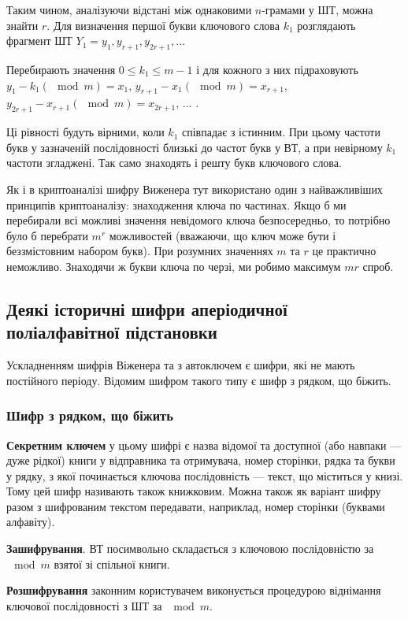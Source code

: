 Таким чином, аналізуючи відстані між однаковими $n$-грамами у ШТ,
можна знайти $r$. Для визначення першої букви ключового слова $k_1$
розглядають фрагмент ШТ $Y_1 = y_1, y_{r+1}, y_{2r+1}, ...$

Перебирають значення $0 \leqslant k_1 \leqslant m-1$ і для кожного з них підраховують
$y_1 - k_1(\mod m) = x_1$, $y_{r+1} - x_1(\mod m) = x_{r+1}$, $y_{2r+1} - x_{r+1}(\mod m) = x_{2r+1}$, ... .

Ці рівності будуть вірними, коли $k_1$ співпадає з істинним. При цьому частоти
букв у зазначеній послідовності близькі до частот букв у ВТ, а при невірному
$k_1$ частоти згладжені. Так само знаходять і решту букв ключового слова.

Як і в криптоаналізі шифру Виженера тут використано один з
найважливіших принципів криптоаналізу: знаходження ключа по частинах.
Якщо б ми перебирали всі можливі значення невідомого ключа
безпосередньо, то потрібно було б перебрати $m^r$ можливостей (вважаючи,
що ключ може бути і беззмістовним набором букв). При розумних значеннях
$m$ та $r$ це практично неможливо. Знаходячи ж букви ключа по черзі, ми
робимо максимум $mr$ спроб.

\subsection{Деякі історичні шифри аперіодичної поліалфавітної підстановки}

Ускладненням шифрів Віженера та з автоключем є шифри, які не
мають постійного періоду. Відомим шифром такого типу є шифр з рядком,
що біжить.

\subsubsection{Шифр з рядком, що біжить}

\textbf{Секретним ключем} у цьому шифрі є назва відомої та доступної (або
навпаки --- дуже рідкої) книги у відправника та отримувача, номер сторінки,
рядка та букви у рядку, з якої починається ключова послідовність --- текст, що
міститься у книзі. Тому цей шифр називають також книжковим. Можна
також як варіант шифру разом з шифрованим текстом передавати, наприклад,
номер сторінки (буквами алфавіту).

\textbf{Зашифрування}. ВТ посимвольно складається з ключовою
послідовністю за $\mod m$ взятої зі спільної книги.

\textbf{Розшифрування} законним користувачем виконується процедурою
віднімання ключової послідовності з ШТ за $\mod m$.

